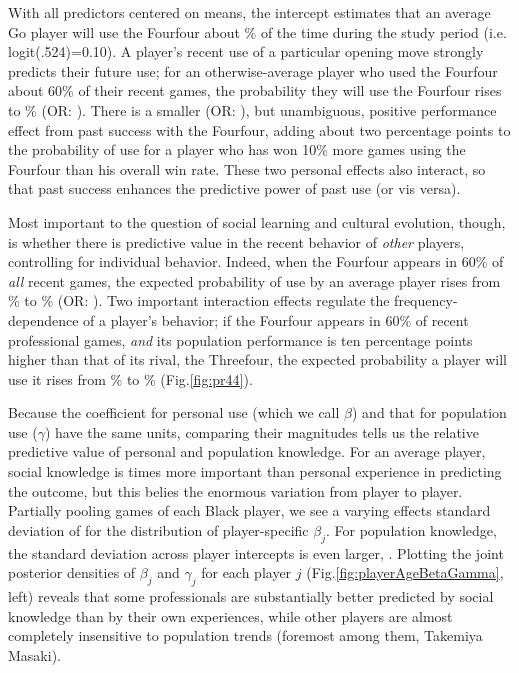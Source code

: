 \documentclass[reqno,12pt]{amsart}
\begin{document}
With all predictors centered on means, the intercept estimates that an average Go player will use the Fourfour about \prIndUseBaseline\% of the time during the study period (i.e. logit(.524)=0.10). A player's recent use of a particular opening move strongly predicts their future use; for an otherwise-average player who used the Fourfour about 60\% of their recent games, the probability they will use the Fourfour rises to \prIndUseSixty\% (OR: \orIndUse). There is a smaller (OR: \orIndUseWin), but unambiguous, positive performance effect from past success with the Fourfour, adding about two percentage points to the probability of use for a player who has won 10\% more games using the Fourfour than his overall win rate. These two personal effects also interact, so that past success enhances the predictive power of past use (or vis versa).

Most important to the question of social learning and cultural evolution, though, is whether there is predictive value in the recent behavior of \textit{other} players, controlling for individual behavior. Indeed, when the Fourfour appears in 60\% of \textit{all} recent games, the expected probability of use by an average player rises from \prIndUseBaseline\% to \prPopUseSixty\% (OR: \orPopUse). Two important interaction effects regulate the frequency-dependence of a player's behavior; if the Fourfour appears in 60\% of recent professional games, \textit{and} its population performance is ten percentage points higher than that of its rival, the Threefour, the expected probability a player will use it rises from \prPopUseSixty\% to \prPopUseSixtyWinTen\% (Fig.\;\ref{fig:pr44}).

Because the coefficient for personal use (which we call $\beta$) and that for population use ($\gamma$) have the same units, comparing their magnitudes tells us the relative predictive value of personal and population knowledge. For an average player, social knowledge is \socialIndyRatio{} times more important than personal experience in predicting the outcome, but this belies the enormous variation from player to player. Partially pooling games of each Black player, we see a varying effects standard deviation of \playerIndyVaref{} for the distribution of player-specific $\beta_j$. For population knowledge, the standard deviation across player intercepts is even larger, \playerSocialVaref. Plotting the joint posterior densities of $\beta_j$ and $\gamma_j$ for each player $j$ (Fig.\;\ref{fig:playerAgeBetaGamma}, left) reveals that some professionals are substantially better predicted by social knowledge than by their own experiences, while other players are almost completely insensitive to population trends (foremost among them, Takemiya Masaki).
\end{document}
